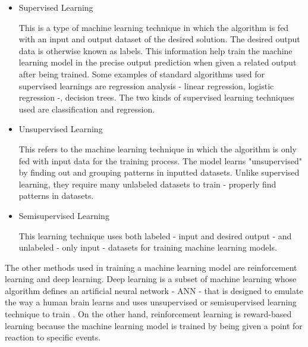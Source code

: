 \documentclass[conference]{IEEEtran}
\begin{document}
	\begin{itemize}
		\item Supervised Learning
		
		This is a type of machine learning technique in which the algorithm is fed with an input and output dataset of the desired solution. The desired output data is otherwise known as labels. This information help train the machine learning model in the precise output prediction when given a related output after being trained. Some examples of standard algorithms used for supervised learnings are regression analysis - linear regression, logistic regression -, decision trees.\cite{theobald2017machine} The two kinds of supervised learning techniques used are classification and regression.
		\item Unsupervised Learning
		
		This refers to the machine learning technique in which the algorithm is only fed with input data for the training process. The model learns "unsupervised" by finding out and grouping patterns in inputted datasets. Unlike supervised learning, they require many unlabeled datasets to train - properly find patterns in datasets.
		\item Semisupervised Learning
		
		This learning technique uses both labeled - input and desired output - and unlabeled - only input - datasets for training machine learning models.
	\end{itemize}
The other methods used in training a machine learning model are reinforcement learning and deep learning. Deep learning is a subset of machine learning whose algorithm defines an artificial neural network - ANN - that is designed to emulate the way a human brain learns and uses unsupervised or semisupervised learning technique to train \cite{ibm_cloud_education_2020}. On the other hand, reinforcement learning is reward-based learning because the machine learning model is trained by being given a point for reaction to specific events.
\end{document}
